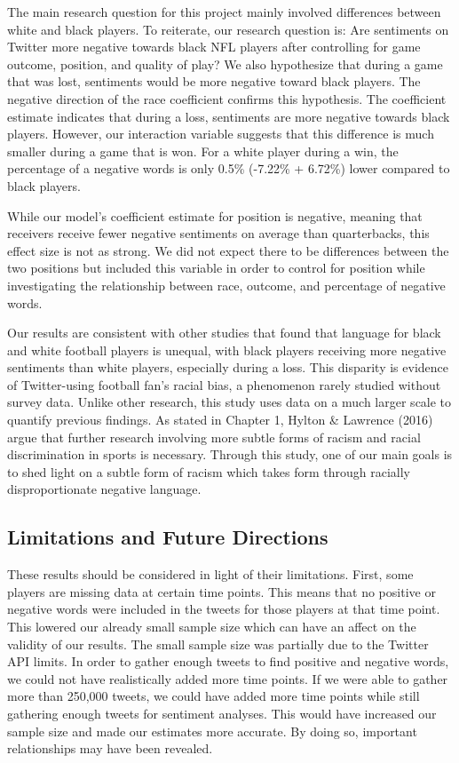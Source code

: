 \documentclass[12pt,twoside]{reedthesis}
\begin{document}
The main research question for this project mainly involved differences
between white and black players. To reiterate, our research question is:
Are sentiments on Twitter more negative towards black NFL players after
controlling for game outcome, position, and quality of play? We also
hypothesize that during a game that was lost, sentiments would be more
negative toward black players. The negative direction of the race
coefficient confirms this hypothesis. The coefficient estimate indicates
that during a loss, sentiments are more negative towards black players.
However, our interaction variable suggests that this difference is much
smaller during a game that is won. For a white player during a win, the
percentage of a negative words is only 0.5\% (-7.22\% + 6.72\%) lower
compared to black players.

While our model's coefficient estimate for position is negative, meaning
that receivers receive fewer negative sentiments on average than
quarterbacks, this effect size is not as strong. We did not expect there
to be differences between the two positions but included this variable
in order to control for position while investigating the relationship
between race, outcome, and percentage of negative words.

Our results are consistent with other studies that found that language
for black and white football players is unequal, with black players
receiving more negative sentiments than white players, especially during
a loss. This disparity is evidence of Twitter-using football fan's
racial bias, a phenomenon rarely studied without survey data. Unlike
other research, this study uses data on a much larger scale to quantify
previous findings. As stated in Chapter 1, Hylton \& Lawrence (2016)
argue that further research involving more subtle forms of racism and
racial discrimination in sports is necessary. Through this study, one of
our main goals is to shed light on a subtle form of racism which takes
form through racially disproportionate negative language.

\subsection{Limitations and Future
Directions}\label{limitations-and-future-directions}

These results should be considered in light of their limitations. First,
some players are missing data at certain time points. This means that no
positive or negative words were included in the tweets for those players
at that time point. This lowered our already small sample size which can
have an affect on the validity of our results. The small sample size was
partially due to the Twitter API limits. In order to gather enough
tweets to find positive and negative words, we could not have
realistically added more time points. If we were able to gather more
than 250,000 tweets, we could have added more time points while still
gathering enough tweets for sentiment analyses. This would have
increased our sample size and made our estimates more accurate. By doing
so, important relationships may have been revealed.
\end{document}
